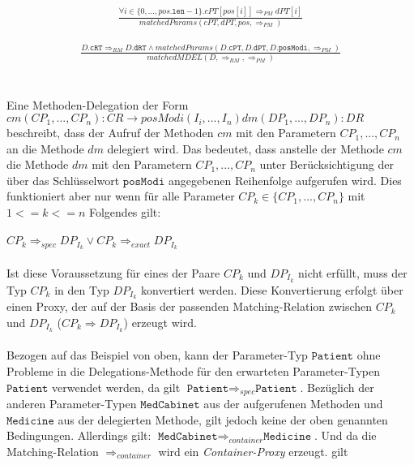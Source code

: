 \documentclass[a4paper,12pt]{article}
\begin{document}
\begin{gather*}
\frac{\forall i \in \{0,...,pos\texttt{.len}-1\}.cPT[pos[i]]\Rightarrow_{PM}dPT[i]}
{matchedParams(cPT,dPT,pos, \Rightarrow_{PM})}
\end{gather*}

\begin{gather*}
\frac{D\texttt{.cRT} \Rightarrow_{RM} D\texttt{.dRT} \wedge matchedParams(D\texttt{.cPT}, D\texttt{.dPT},D\texttt{.posModi}, \Rightarrow_{PM})}
{matchedMDEL(D,\Rightarrow_{RM}, \Rightarrow_{PM})}
\end{gather*}
\\\\
Eine Methoden-Delegation der Form\\
$cm(CP_1,...,CP_n):CR \rightarrow  posModi(I_i,...,I_n) dm(DP_1,...,DP_n):DR$\\
beschreibt, dass der Aufruf der Methoden $cm$ mit den Parametern $CP_1,...,CP_n$ an die Methode $dm$ delegiert wird. Das bedeutet, dass anstelle der Methode $cm$ die Methode $dm$ mit den Parametern $CP_1,...,CP_n$ unter Berücksichtigung der über das Schlüsselwort $\texttt{posModi}$ angegebenen Reihenfolge aufgerufen wird. Dies funktioniert aber nur wenn für alle Parameter $CP_k \in \{CP_1,...,CP_n\}$ mit $1<=k<=n$ Folgendes gilt:\\\\
$CP_k \Rightarrow_{spec} DP_{I_k} \vee CP_k \Rightarrow_{exact} DP_{I_k}$\\\\
Ist diese Voraussetzung für eines der Paare $CP_k$ und $DP_{I_k}$ nicht erfüllt, muss der Typ $CP_k$ in den Typ $DP_{I_k}$ konvertiert werden. Diese Konvertierung erfolgt über einen Proxy, der auf der Basis der passenden Matching-Relation zwischen $CP_k$ und $DP_{I_k}$ ($CP_k \Rightarrow DP_{I_k}$) erzeugt wird. \\\\
Bezogen auf das Beispiel von oben, kann der Parameter-Typ $\texttt{Patient}$ ohne Probleme in die Delegations-Methode für den erwarteten Parameter-Typen $\texttt{Patient}$ verwendet werden, da gilt $\texttt{Patient} \Rightarrow_{spec} \texttt{Patient}$. Bezüglich der anderen Parameter-Typen $\texttt{MedCabinet}$ aus der aufgerufenen Methoden und $\texttt{Medicine}$ aus der delegierten Methode, gilt jedoch keine der oben genannten Bedingungen. Allerdings gilt: $\texttt{MedCabinet} \Rightarrow_{container}\texttt{Medicine}$. Und da die Matching-Relation $\Rightarrow_{container}$ wird ein \emph{Container-Proxy} erzeugt. 
gilt
\newpage
\end{document}
